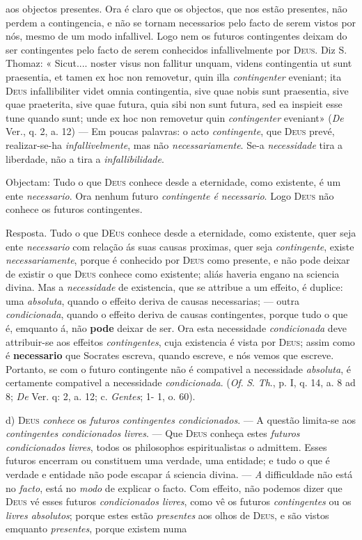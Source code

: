 aos objectos presentes. Ora é claro que os objectos, que nos estão presentes, não perdem a contingencia, e não se tornam necessarios pelo facto de serem vistos por nós, mesmo de um modo infallivel. Logo nem os futuros contingentes deixam do ser contingentes pelo facto de serem conhecidos infallivelmente por \textsc{Deus}. Diz S. Thomaz: « Sicut.... noster visus non fallitur unquam, videns contingentia ut sunt praesentia, et tamen ex hoc non removetur, quin illa \emph{contingenter} eveniant; ita \textsc{Deus} infallibiliter videt omnia contingentia, sive quae nobis sunt praesentia, sive quae praeterita, sive quae futura, quia sibi non sunt futura, sed ea inspieit esse tune quando sunt; unde ex hoc non removetur quin \emph{contingenter} eveniant» (\emph{De} Ver., q. 2, a. 12) --- Em poucas palavras: o acto \emph{contingente}, que \textsc{Deus} prevé, realizar-se-ha \emph{infallivelmente}, mas não \emph{necessariamente}. Se-a \emph{necessidade} tira a liberdade, não a tira a \emph{infallibilidade}.\par Objectam: Tudo o que \textsc{Deus} conhece desde a eternidade, como existente, é um ente \emph{necessario}. Ora nenhum futuro \emph{contingente é necessario}. Logo \textsc{Deus} não conhece os futuros contingentes.\par Resposta. Tudo o que \textsc{DEus} conhece desde a eternidade, como existente, quer seja ente \emph{necessario} com relação ás suas causas proximas, quer seja \emph{contingente}, existe \emph{necessariamente}, porque é conhecido por \textsc{Deus} como presente, e não pode deixar de existir o que \textsc{Deus} conhece como existente; aliás haveria engano na sciencia divina. Mas a \emph{necessidade} de existencia, que se attribue a um effeito, é duplice: uma \emph{absoluta}, quando o effeito deriva de causas necessarias; --- outra \emph{condicionada}, quando o effeito deriva de causas contingentes, porque tudo o que é, emquanto á, não \textbf{pode} deixar de ser. Ora esta necessidade \emph{condicionada} deve attribuir-se aos effeitos \emph{contingentes}, cuja existencia é vista por \textsc{Deus}; assim como é \textbf{necessario} que Socrates escreva, quando escreve, e nós vemos que escreve. Portanto, se com o futuro contingente não é compativel a necessidade \emph{absoluta}, é certamente compativel a necessidade \emph{condicionada}. (\emph{Of}. \emph{S}. \emph{Th}., p. I, q. 14, a. 8 ad 8; \emph{De} Ver. q: 2, a. 12; c. \emph{Gentes}; 1- 1, o. 60).\par d) \textsc{Deus} \emph{conhece} os \emph{futuros contingentes condicionados}. --- A questão limita-se aos \emph{contingentes condicionados livres}. --- Que \textsc{Deus} conheça estes \emph{futuros condicionados livres}, todos os philosophos espiritualistas o admittem. Esses futuros encerram ou constituem uma verdade, uma entidade; e tudo o que é verdade e entidade não pode escapar á sciencia divina. --- \emph{A} difficuldade não está no \emph{facto}, está no \emph{modo} de explicar o facto. Com effeito, não podemos dizer que \textsc{Deus} vé esses futuros \emph{condicionados livres}, como vê os futuros \emph{contingentes} ou os \emph{livres absolutos}; porque estes estão \emph{presentes} aos olhos de \textsc{Deus}, e são vistos emquanto \emph{presentes}, porque existem numa 
